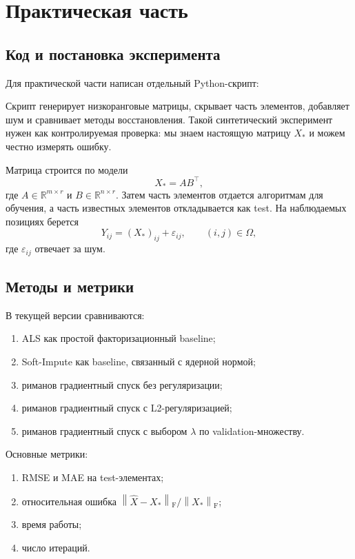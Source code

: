 \documentclass[a4paper,12pt]{article}
\newcommand{\R}{\mathbb{R}}
\newcommand{\fro}[1]{\left\lVert #1 \right\rVert_{\mathrm F}}
\begin{document}
\section{Практическая часть}
\label{sec:empirical}

\subsection{Код и постановка эксперимента}

Для практической части написан отдельный Python-скрипт:
\begin{center}
\end{center}
Скрипт генерирует низкоранговые матрицы, скрывает часть элементов, добавляет шум и сравнивает методы восстановления. Такой синтетический эксперимент нужен как контролируемая проверка: мы знаем настоящую матрицу $X_*$ и можем честно измерять ошибку.

Матрица строится по модели
\[
X_* = AB^\top,
\]
где $A\in\R^{m\times r}$ и $B\in\R^{n\times r}$. Затем часть элементов отдается алгоритмам для обучения, а часть известных элементов откладывается как test. На наблюдаемых позициях берется
\[
Y_{ij}=(X_*)_{ij}+\varepsilon_{ij}, \qquad (i,j)\in\Omega,
\]
где $\varepsilon_{ij}$ отвечает за шум.

\subsection{Методы и метрики}

В текущей версии сравниваются:
\begin{enumerate}[label=\arabic*.]
    \item ALS как простой факторизационный baseline;
    \item Soft-Impute как baseline, связанный с ядерной нормой;
    \item риманов градиентный спуск без регуляризации;
    \item риманов градиентный спуск с L2-регуляризацией;
    \item риманов градиентный спуск с выбором $\lambda$ по validation-множеству.
\end{enumerate}

Основные метрики:
\begin{enumerate}[label=\arabic*.]
    \item RMSE и MAE на test-элементах;
    \item относительная ошибка $\fro{\widehat X-X_*}/\fro{X_*}$;
    \item время работы;
    \item число итераций.
\end{enumerate}
\end{document}
